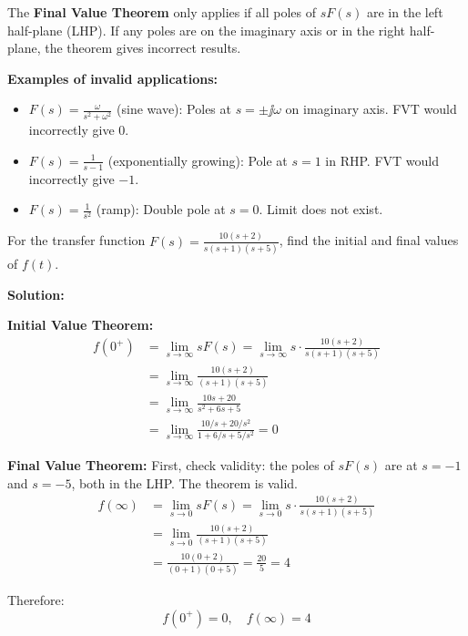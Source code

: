\begin{warningbox}[title=Limitations of the Final Value Theorem]
The \textbf{Final Value Theorem} only applies if all poles of $sF(s)$ are in the left half-plane (LHP). If any poles are on the imaginary axis or in the right half-plane, the theorem gives incorrect results.

\textbf{Examples of invalid applications:}
\begin{itemize}
    \item $F(s) = \frac{\omega}{s^2 + \omega^2}$ (sine wave): Poles at $s = \pm\jj\omega$ on imaginary axis. FVT would incorrectly give 0.
    \item $F(s) = \frac{1}{s-1}$ (exponentially growing): Pole at $s = 1$ in RHP. FVT would incorrectly give $-1$.
    \item $F(s) = \frac{1}{s^2}$ (ramp): Double pole at $s = 0$. Limit does not exist.
\end{itemize}
\end{warningbox}

\begin{examplebox}[title=Example: Initial and Final Value Theorems]
For the transfer function $F(s) = \frac{10(s+2)}{s(s+1)(s+5)}$, find the initial and final values of $f(t)$.

\textbf{Solution:}

\textbf{Initial Value Theorem:}
\begin{align}
f(0^+) &= \lim_{s \to \infty} sF(s) = \lim_{s \to \infty} s \cdot \frac{10(s+2)}{s(s+1)(s+5)} \\
&= \lim_{s \to \infty} \frac{10(s+2)}{(s+1)(s+5)} \\
&= \lim_{s \to \infty} \frac{10s + 20}{s^2 + 6s + 5} \\
&= \lim_{s \to \infty} \frac{10/s + 20/s^2}{1 + 6/s + 5/s^2} = 0
\end{align}

\textbf{Final Value Theorem:}
First, check validity: the poles of $sF(s)$ are at $s = -1$ and $s = -5$, both in the LHP. The theorem is valid.
\begin{align}
f(\infty) &= \lim_{s \to 0} sF(s) = \lim_{s \to 0} s \cdot \frac{10(s+2)}{s(s+1)(s+5)} \\
&= \lim_{s \to 0} \frac{10(s+2)}{(s+1)(s+5)} \\
&= \frac{10(0+2)}{(0+1)(0+5)} = \frac{20}{5} = 4
\end{align}

Therefore:
\begin{equation}
\boxed{f(0^+) = 0, \quad f(\infty) = 4}
\end{equation}
\end{examplebox}

